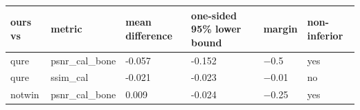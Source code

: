 \begin{tabular}{llllll}
\toprule
ours vs & metric & mean difference & one-sided 95\% lower bound & margin & non-inferior \\
\midrule
qure & psnr\_cal\_bone & -0.057 & -0.152 & $-$0.5 & yes \\
qure & ssim\_cal & -0.021 & -0.023 & $-$0.01 & no \\
notwin & psnr\_cal\_bone & 0.009 & -0.024 & $-$0.25 & yes \\
\bottomrule
\end{tabular}
